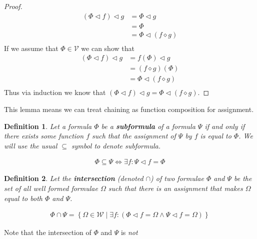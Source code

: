 \documentclass{article}
\newtheorem{defin}{Definition}
\begin{document}
\begin{proof}
\begin{align*}
(\Phi \lhd f) \lhd g &= \Phi \lhd g              \tag{Definition of Assignment} \\
                     &= \Phi                     \tag{Definition of Assignment} \\
                     &= \Phi \lhd (f \diamond g) \tag{Definition of Assignment} \\
\end{align*}
If we assume that $\Phi \in \mathcal{V}$ we can show that
\begin{align*}
(\Phi \lhd f) \lhd g &= f(\Phi) \lhd g           \tag{Definition of Assignment} \\
                     &= (f \diamond g) (\Phi)    \tag{Definition of Assignment} \\
                     &= \Phi \lhd (f \diamond g) \tag{Definition of Chain} \\
\end{align*}
Thus via induction we know that $(\Phi\lhd f)\lhd g=\Phi\lhd(f\diamond g)$.
\end{proof}

This lemma means we can treat chaining as function composition for assignment.

\begin{defin}
Let a formula $\Phi$ be a \textbf{subformula} of a formula $\Psi$
if and only if there exists some function $f$ such that the assignment of $\Psi$ by $f$ is equal to $\Phi$.
We will use the usual $\subseteq$ symbol to denote subformula.

\begin{align*}
\Phi \subseteq \Psi \iff \exists f: \Psi \lhd f = \Phi
\end{align*}
\end{defin}

\begin{defin}
Let the \textbf{intersection} (denoted $\cap$) of two formulae $\Phi$ and $\Psi$ be
the set of all well formed formulae $\Omega$ such that there is an assignment that makes $\Omega$ equal to both $\Phi$ and $\Psi$.

\begin{align*}
\Phi \cap \Psi = \left\{\Omega \in \mathcal{W} \mid \exists f: (\Phi \lhd f = \Omega \land \Psi \lhd f = \Omega)\right\}
\end{align*}
\end{defin}

Note that the intersection of $\Phi$ and $\Psi$ is \textit{not}
\end{document}
